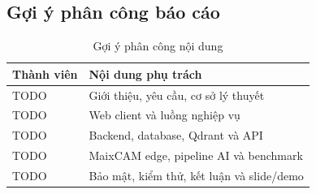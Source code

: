\subsection{Gợi ý phân công báo cáo}
\begin{table}[H]
  \centering
  \caption{Gợi ý phân công nội dung}
  \begin{tabularx}{\textwidth}{lX}
    \toprule
    \textbf{Thành viên} & \textbf{Nội dung phụ trách} \\
    \midrule
    TODO & Giới thiệu, yêu cầu, cơ sở lý thuyết \\
    TODO & Web client và luồng nghiệp vụ \\
    TODO & Backend, database, Qdrant và API \\
    TODO & MaixCAM edge, pipeline AI và benchmark \\
    TODO & Bảo mật, kiểm thử, kết luận và slide/demo \\
    \bottomrule
  \end{tabularx}
\end{table}

